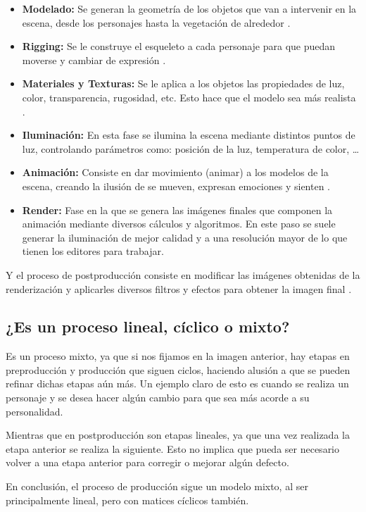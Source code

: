 \documentclass{article}
\begin{document}
\begin{itemize}
    \item \textbf{Modelado: }Se generan la geometría de los objetos que van a intervenir en la escena, desde los personajes hasta la vegetación de alrededor \cite{uclm}.
    \item \textbf{Rigging: }Se le construye el esqueleto a cada personaje para que puedan moverse y cambiar de expresión \cite{animum}.
    \item \textbf{Materiales y Texturas: }Se le aplica a los objetos las propiedades de luz, color, transparencia, rugosidad, etc. Esto hace que el modelo sea más realista \cite{animum}.
    \item \textbf{Iluminación: }En esta fase se ilumina la escena mediante distintos puntos de luz, controlando parámetros como: posición de la luz, temperatura de color, \dots \cite{animum}
    \item \textbf{Animación: }Consiste en dar movimiento (animar) a los modelos de la escena, creando la ilusión de se mueven, expresan emociones y sienten \cite{animum}.
    \item \textbf{Render: }Fase en la que se genera las imágenes finales que componen la animación mediante diversos cálculos y algoritmos. En este paso se suele generar la iluminación de mejor calidad y a una resolución mayor de lo que tienen los editores para trabajar.
\end{itemize}

Y el proceso de postproducción consiste en modificar las imágenes obtenidas de la renderización y aplicarles diversos filtros y efectos para obtener la imagen final \cite{uclm}.

\subsection{¿Es un proceso lineal, cíclico o mixto?}
Es un proceso mixto, ya que si nos fijamos en la imagen anterior, hay etapas en preproducción y producción que siguen ciclos, haciendo alusión a que se pueden refinar dichas etapas aún más. Un ejemplo claro de esto es cuando se realiza un personaje y se desea hacer algún cambio para que sea más acorde a su personalidad.

Mientras que en postproducción son etapas lineales, ya que una vez realizada la etapa anterior se realiza la siguiente. Esto no implica que pueda ser necesario volver a una etapa anterior para corregir o mejorar algún defecto.

En conclusión, el proceso de producción sigue un modelo mixto, al ser principalmente lineal, pero con matices cíclicos también.
\end{document}
